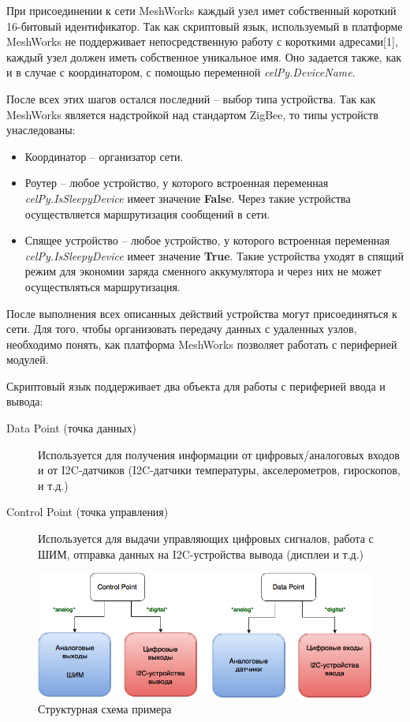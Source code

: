\documentclass[11pt]{article}
\begin{document}
При присоединении к сети MeshWorks каждый узел имет собственный короткий 16-битовый
идентификатор. Так как скриптовый язык, используемый в платформе MeshWorks не поддерживает
непосредственную работу с короткими адресами[1], каждый узел должен иметь собственное
уникальное имя. Оно задается также, как и в случае с координатором, с помощью переменной
\emph{celPy.DeviceName}.

После всех этих шагов остался последний -- выбор типа устройства. Так как MeshWorks 
является надстройкой над стандартом ZigBee, то типы устройств унаследованы:
\begin{itemize}
    \item Координатор -- организатор сети.
    \item Роутер -- любое устройство, у которого встроенная переменная 
    \emph{celPy.IsSleepyDevice} имеет значение \textbf{False}. Через такие устройства
    осуществляется маршрутизация сообщений в сети.
    \item Спящее устройство -- любое устройство, у которого встроенная переменная 
    \emph{celPy.IsSleepyDevice} имеет значение \textbf{True}. Такие устройства уходят
    в спящий режим для экономии заряда сменного аккумулятора и через них не может
    осуществляться маршрутизация.
\end{itemize}

После выполнения всех описанных действий устройства могут присоединяться к сети. 
Для того, чтобы организовать передачу данных с удаленных узлов, необходимо понять, 
как платформа MeshWorks позволяет работать с периферией модулей.

Скриптовый язык поддерживает два объекта для работы с периферией ввода и вывода:

\begin{description}
    \item[Data Point (точка данных)] Используется для получения информации от 
    цифровых/аналоговых входов и от I2C-датчиков (I2C-датчики температуры, акселерометров,
    гироскопов, и т.д.)
    \item[Control Point (точка управления)] Используется для выдачи управляющих цифровых 
    сигналов, работа с ШИМ, отправка данных на I2C-устройства вывода (дисплеи и т.д.)
\end{description}

\begin{figure}[h!]
    \centering
    \includegraphics[scale=0.5]{DC_points.png}
    \caption{Структурная схема примера}
\end{figure}
\end{document}
